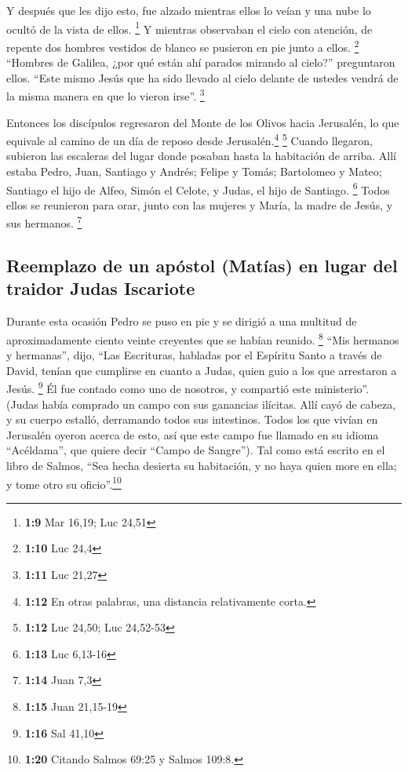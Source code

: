  Y después que les dijo esto, fue alzado mientras ellos lo
veían y una nube lo ocultó de la vista de ellos. \footnote{\textbf{1:9}
  Mar 16,19; Luc 24,51}  Y mientras observaban el cielo
con atención, de repente dos hombres vestidos de blanco se pusieron en
pie junto a ellos. \footnote{\textbf{1:10} Luc 24,4} 
``Hombres de Galilea, ¿por qué están ahí parados mirando al cielo?''
preguntaron ellos. ``Este mismo Jesús que ha sido llevado al cielo
delante de ustedes vendrá de la misma manera en que lo vieron irse''.
\footnote{\textbf{1:11} Luc 21,27}

 Entonces los discípulos regresaron del Monte de los
Olivos hacia Jerusalén, lo que equivale al camino de un día de reposo
desde Jerusalén.\footnote{\textbf{1:12} En otras palabras, una distancia
  relativamente corta.} \footnote{\textbf{1:12} Luc 24,50; Luc 24,52-53}
 Cuando llegaron, subieron las escaleras del lugar donde
posaban hasta la habitación de arriba. Allí estaba Pedro, Juan, Santiago
y Andrés; Felipe y Tomás; Bartolomeo y Mateo; Santiago el hijo de Alfeo,
Simón el Celote, y Judas, el hijo de Santiago. \footnote{\textbf{1:13}
  Luc 6,13-16}  Todos ellos se reunieron para orar, junto
con las mujeres y María, la madre de Jesús, y sus hermanos. \footnote{\textbf{1:14}
  Juan 7,3}

\hypertarget{reemplazo-de-un-apuxf3stol-matuxedas-en-lugar-del-traidor-judas-iscariote}{%
\subsection{Reemplazo de un apóstol (Matías) en lugar del traidor Judas
Iscariote}\label{reemplazo-de-un-apuxf3stol-matuxedas-en-lugar-del-traidor-judas-iscariote}}

 Durante esta ocasión Pedro se puso en pie y se dirigió a
una multitud de aproximadamente ciento veinte creyentes que se habían
reunido. \footnote{\textbf{1:15} Juan 21,15-19}  ``Mis
hermanos y hermanas'', dijo, ``Las Escrituras, habladas por el Espíritu
Santo a través de David, tenían que cumplirse en cuanto a Judas, quien
guio a los que arrestaron a Jesús. \footnote{\textbf{1:16} Sal 41,10}
 Él fue contado como uno de nosotros, y compartió este
ministerio''.  (Judas había comprado un campo con sus
ganancias ilícitas. Allí cayó de cabeza, y su cuerpo estalló, derramando
todos sus intestinos.  Todos los que vivían en Jerusalén
oyeron acerca de esto, así que este campo fue llamado en su idioma
``Acéldama'', que quiere decir ``Campo de Sangre'').  Tal
como está escrito en el libro de Salmos, ``Sea hecha desierta su
habitación, y no haya quien more en ella; y tome otro su
oficio''.\footnote{\textbf{1:20} Citando Salmos 69:25 y Salmos 109:8.}

